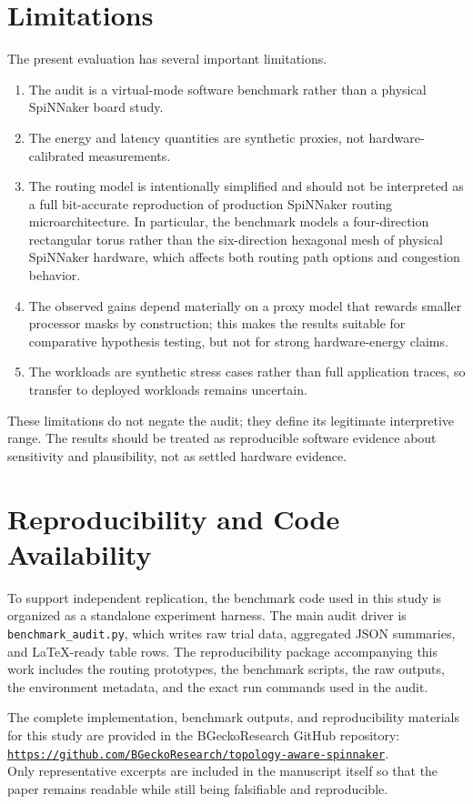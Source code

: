 \documentclass[11pt]{article}
\begin{document}
\section{Limitations}
The present evaluation has several important limitations.
\begin{enumerate}[label=(L\arabic*)]
    \item The audit is a virtual-mode software benchmark rather than a physical SpiNNaker board study.
    \item The energy and latency quantities are synthetic proxies, not hardware-calibrated measurements.
    \item The routing model is intentionally simplified and should not be interpreted as a full bit-accurate reproduction of production SpiNNaker routing microarchitecture. In particular, the benchmark models a four-direction rectangular torus rather than the six-direction hexagonal mesh of physical SpiNNaker hardware, which affects both routing path options and congestion behavior. 
    \item The observed gains depend materially on a proxy model that rewards smaller processor masks by construction; this makes the results suitable for comparative hypothesis testing, but not for strong hardware-energy claims.
    \item The workloads are synthetic stress cases rather than full application traces, so transfer to deployed workloads remains uncertain.
\end{enumerate}
These limitations do not negate the audit; they define its legitimate interpretive range. The results should be treated as reproducible software evidence about sensitivity and plausibility, not as settled hardware evidence.

\section{Reproducibility and Code Availability}
To support independent replication, the benchmark code used in this study is organized as a standalone experiment harness. The main audit driver is \texttt{benchmark\_audit.py}, which writes raw trial data, aggregated JSON summaries, and LaTeX-ready table rows. The reproducibility package accompanying this work includes the routing prototypes, the benchmark scripts, the raw outputs, the environment metadata, and the exact run commands used in the audit.

The complete implementation, benchmark outputs, and reproducibility materials for this study are provided in the BGeckoResearch GitHub repository:\\
\href{https://github.com/BGeckoResearch/topology-aware-spinnaker}{\texttt{https://github.com/BGeckoResearch/topology-aware-spinnaker}}.\\
Only representative excerpts are included in the manuscript itself so that the paper remains readable while still being falsifiable and reproducible.
\end{document}
